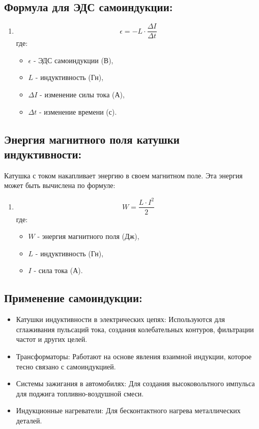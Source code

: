 \documentclass[a4paper,12pt]{article}
\begin{document}
\vspace{-9pt}
\subsection*{Формула для ЭДС самоиндукции:}
\vspace{-3pt}
\begin{enumerate}[itemsep=0pt, topsep=0pt, parsep=3pt]
  \item 
  \vspace{-0.05em}
  $$ \epsilon = -L \cdot \frac{\Delta I}{\Delta t} $$
  где:
  \begin{itemize}
    \item $\epsilon$ - ЭДС самоиндукции (В),
    \item $L$ - индуктивность (Гн),
    \item $\Delta I$ - изменение силы тока (А),
    \item $\Delta t$ - изменение времени (с).
  \end{itemize}
\end{enumerate}

\vspace{-9pt}
\subsection*{Энергия магнитного поля катушки индуктивности:}
\vspace{-3pt}
Катушка с током накапливает энергию в своем магнитном поле. Эта энергия может быть вычислена по формуле:
\begin{enumerate}[itemsep=0pt, topsep=0pt, parsep=3pt]
  \item 
  \vspace{-0.05em}
  $$ W = \frac{L \cdot I^2}{2} $$
  где:
  \begin{itemize}
    \item $W$ - энергия магнитного поля (Дж),
    \item $L$ - индуктивность (Гн),
    \item $I$ - сила тока (А).
  \end{itemize}
\end{enumerate}

\vspace{-9pt}
\subsection*{Применение самоиндукции:}
\vspace{-3pt}
\begin{itemize}
  \item Катушки индуктивности в электрических цепях: Используются для сглаживания пульсаций тока, создания колебательных контуров, фильтрации частот и других целей.
  \item Трансформаторы: Работают на основе явления взаимной индукции, которое тесно связано с самоиндукцией.
  \item Системы зажигания в автомобилях: Для создания высоковольтного импульса для поджига топливно-воздушной смеси.
  \item Индукционные нагреватели: Для бесконтактного нагрева металлических деталей.
\end{itemize}
\end{document}

